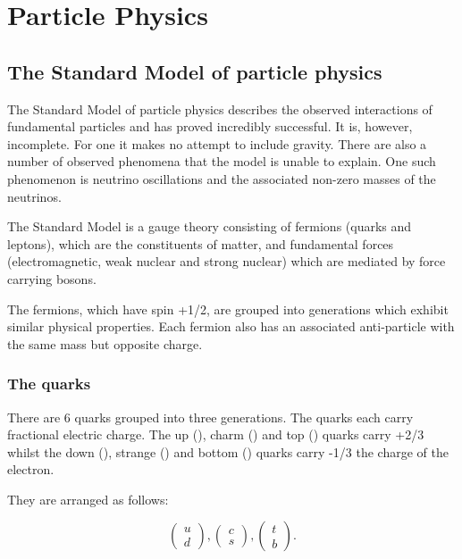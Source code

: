 \chapter{Particle Physics}
\label{chap:particle-physics}

\section{The Standard Model of particle physics}
\label{section:particle-physics:SM}
The Standard Model of particle physics describes the observed interactions of fundamental particles and has proved incredibly successful. It is, however, incomplete. For one it makes no attempt to include gravity. There are also a number of observed phenomena that the model is unable to explain. One such phenomenon is neutrino oscillations and the associated non-zero masses of the neutrinos. 

The Standard Model is a   \CrossProduct {} gauge theory consisting of fermions (quarks and leptons), which are the constituents of matter, and fundamental forces (electromagnetic, weak nuclear and strong nuclear) which are mediated by force carrying bosons.

The fermions, which have spin +1/2, are grouped into generations which exhibit similar physical properties. Each fermion also has an associated anti-particle with the same mass but opposite charge. 

\subsection{The quarks}
\label{section:particle-physics:SM:quarks}

There are 6 quarks grouped into three generations. The quarks each carry fractional electric charge. The up (\Pup), charm (\Pcharm) and top (\Ptop) quarks carry +2/3 whilst the down (\Pdown), strange (\Pstrange) and bottom (\Pbottom) quarks carry -1/3 the charge of the electron.

They are arranged as follows:

\begin{equation}
  \begin{pmatrix}
    u \\
    d
  \end{pmatrix}
  ,
  \begin{pmatrix}
    c \\
    s
  \end{pmatrix}
  ,
  \begin{pmatrix}
    t \\
    b
  \end{pmatrix}
.
\end{equation}

